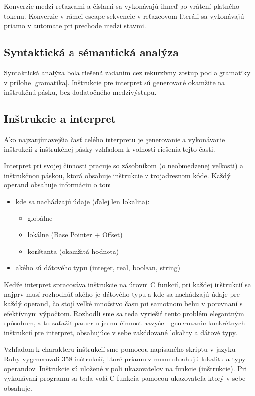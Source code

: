 \documentclass[12pt,a4paper,titlepage,final]{article}
\begin{document}
Konverzie medzi reťazcami a číslami sa vykonávajú ihneď po vrátení platného tokenu.
Konverzie v rámci escape sekvencie v reťazcovom literáli sa vykonávajú
 priamo v automate pri prechode medzi stavmi.

\subsection{Syntaktická a sémantická analýza}
Syntaktická analýza bola riešená zadaním cez rekurzívny zostup podľa gramatiky
v prílohe \ref{gramatika}. 
Inštrukcie pre interpret sú generované okamžite na inštrukčnú pásku,
 bez dodatočného medzivýstupu.

\subsection{Inštrukcie a interpret}
Ako najzaujímavejšia časť celého interpretu je generovanie a vykonávanie inštrukcií
z inštrukčnej pásky vzhľadom k voľnosti riešenia tejto časti.

Interpret pri svojej činnosti pracuje so zásobníkom (o neobmedzenej veľkosti) a
inštrukčnou páskou, ktorá obsahuje inštrukcie v trojadresnom kóde.
Každý operand obsahuje informáciu o tom 
\begin{itemize}
	\item kde sa nachádzajú údaje (ďalej len lokalita):
		\begin{itemize}
			\item globálne
			\item lokálne (Base Pointer + Offset)
			\item konštanta (okamžitá hodnota)
		\end{itemize}
	\item akého sú dátového typu (integer, real, boolean, string)
\end{itemize}

Kedže interpret spracováva inštrukcie na úrovni C funkcií, pri každej inštrukcií
 sa najprv musí rozhodnúť akého je dátového typu a kde sa nachádzajú údaje pre 
 každý operand, čo stojí veľké množstvo času pri samotnom behu v porovnaní 
 s efektívnym výpočtom.
Rozhodli sme sa teda vyriešiť tento problém elegantným spôsobom, 
 a to zaťažiť parser o jednu činnosť navyše - generovanie konkrétnych 
 inštrukcií pre interpret, obsahujúce v sebe zakódované lokality a dátové typy.

Vzhľadom k charakteru inštrukcií sme pomocou napísaného skriptu v jazyku Ruby
 vygenerovali 358 inštrukcií, 
 ktoré priamo v mene obsahujú lokalitu a typy operandov.
Inštrukcie sú uložené v poli ukazovateľov na funkcie (inštrukcie).
 Pri vykonávaní programu sa teda volá C funkcia pomocou ukazovateľa ktorý 
 v sebe obsahuje.
\end{document}
